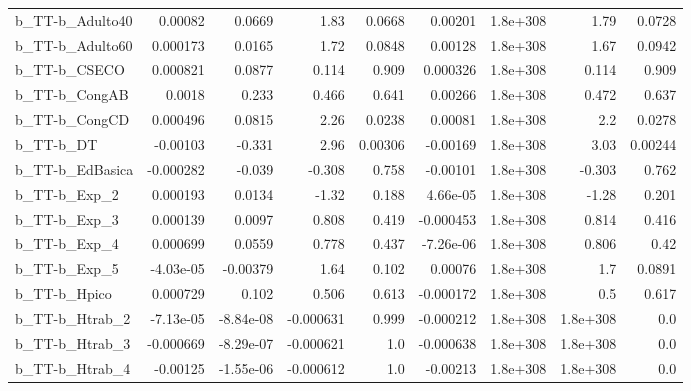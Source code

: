 \begin{tabular}{lrrrrrrrr}
b\_TT-b\_Adulto40              &     0.00082 &       0.0669 &      1.83 &   0.0668 &    0.00201 &    1.8e+308 &         1.79 &        0.0728 \\
b\_TT-b\_Adulto60              &    0.000173 &       0.0165 &      1.72 &   0.0848 &    0.00128 &    1.8e+308 &         1.67 &        0.0942 \\
b\_TT-b\_CSECO                 &    0.000821 &       0.0877 &     0.114 &    0.909 &   0.000326 &    1.8e+308 &        0.114 &         0.909 \\
b\_TT-b\_CongAB                &      0.0018 &        0.233 &     0.466 &    0.641 &    0.00266 &    1.8e+308 &        0.472 &         0.637 \\
b\_TT-b\_CongCD                &    0.000496 &       0.0815 &      2.26 &   0.0238 &    0.00081 &    1.8e+308 &          2.2 &        0.0278 \\
b\_TT-b\_DT                    &    -0.00103 &       -0.331 &      2.96 &  0.00306 &   -0.00169 &    1.8e+308 &         3.03 &       0.00244 \\
b\_TT-b\_EdBasica              &   -0.000282 &       -0.039 &    -0.308 &    0.758 &   -0.00101 &    1.8e+308 &       -0.303 &         0.762 \\
b\_TT-b\_Exp\_2                 &    0.000193 &       0.0134 &     -1.32 &    0.188 &   4.66e-05 &    1.8e+308 &        -1.28 &         0.201 \\
b\_TT-b\_Exp\_3                 &    0.000139 &       0.0097 &     0.808 &    0.419 &  -0.000453 &    1.8e+308 &        0.814 &         0.416 \\
b\_TT-b\_Exp\_4                 &    0.000699 &       0.0559 &     0.778 &    0.437 &  -7.26e-06 &    1.8e+308 &        0.806 &          0.42 \\
b\_TT-b\_Exp\_5                 &   -4.03e-05 &     -0.00379 &      1.64 &    0.102 &    0.00076 &    1.8e+308 &          1.7 &        0.0891 \\
b\_TT-b\_Hpico                 &    0.000729 &        0.102 &     0.506 &    0.613 &  -0.000172 &    1.8e+308 &          0.5 &         0.617 \\
b\_TT-b\_Htrab\_2               &   -7.13e-05 &    -8.84e-08 & -0.000631 &    0.999 &  -0.000212 &    1.8e+308 &     1.8e+308 &           0.0 \\
b\_TT-b\_Htrab\_3               &   -0.000669 &    -8.29e-07 & -0.000621 &      1.0 &  -0.000638 &    1.8e+308 &     1.8e+308 &           0.0 \\
b\_TT-b\_Htrab\_4               &    -0.00125 &    -1.55e-06 & -0.000612 &      1.0 &   -0.00213 &    1.8e+308 &     1.8e+308 &           0.0 \\

\end{tabular}
